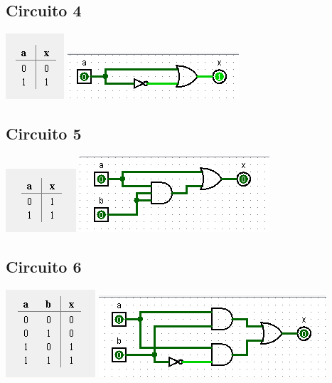 \documentclass[12pt]{article}
\begin{document}
\subsection{Circuito 4}
    \includegraphics{./images/circuito03_table.png}
\includegraphics{./images/circuito04.png}
\subsection{Circuito 5}
    \includegraphics{./images/circuito04_table.png}
\includegraphics{./images/circuito05.png}
\subsection{Circuito 6}
    \includegraphics{./images/circuito05_table.png}
\includegraphics{./images/circuito06.png}
\end{document}
